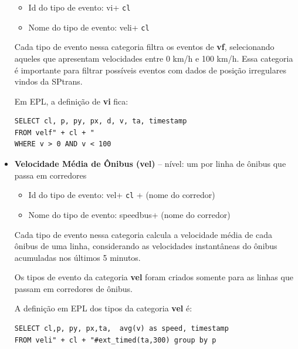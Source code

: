 \begin{itemize}
    \begin{itemize}
        \item Id do tipo de evento: vi+ \texttt{cl} %
        \item Nome do tipo de evento: veli+ \texttt{cl}%
    \end{itemize}
    Cada tipo de evento nessa categoria filtra os eventos de \textbf{vf}, selecionando aqueles que apresentam velocidades entre 0 km/h e 100 km/h. Essa categoria é importante para filtrar possíveis eventos com dados de posição irregulares vindos da SPtrans. 
    
    Em EPL, a definição de \textbf{vi} fica: 
\begin{verbatim}
SELECT cl, p, py, px, d, v, ta, timestamp 
FROM velf" + cl + " 
WHERE v > 0 AND v < 100
\end{verbatim}


    \item \textbf{Velocidade Média de Ônibus (vel)} -- nível: um por linha de ônibus que passa em corredores
    
    \begin{itemize}
        \item Id do tipo de evento: vel+ \texttt{cl} + (nome do corredor) %
        \item Nome do tipo de evento: speedbus+ (nome do corredor)
    \end{itemize}
 
    Cada tipo de evento nessa categoria calcula a velocidade média de cada ônibus de uma linha, considerando as velocidades instantâneas do ônibus acumuladas nos últimos 5 minutos. 
    
    Os tipos de evento da categoria \textbf{vel} foram criados somente para as linhas que passam em corredores de ônibus.%
    
    A definição em EPL dos tipos da categoria \textbf{vel} é:
\begin{verbatim}
SELECT cl,p, py, px,ta,  avg(v) as speed, timestamp 
FROM veli" + cl + "#ext_timed(ta,300) group by p
\end{verbatim}



\end{itemize}

